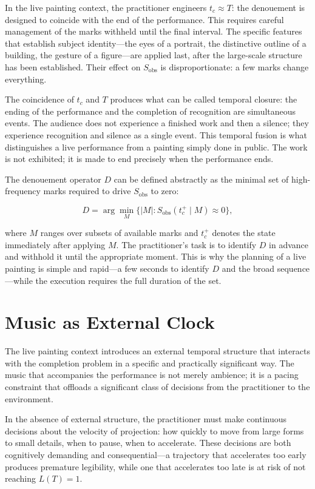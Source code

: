 \documentclass[12pt, twoside]{article}
\theoremstyle{plain}
\theoremstyle{definition}
\theoremstyle{remark}
\begin{document}
In the live painting context, the practitioner engineers $t_c \approx T$: the denouement is designed to coincide with the end of the performance. This requires careful management of the marks withheld until the final interval. The specific features that establish subject identity---the eyes of a portrait, the distinctive outline of a building, the gesture of a figure---are applied last, after the large-scale structure has been established. Their effect on $S_{\text{obs}}$ is disproportionate: a few marks change everything.

The coincidence of $t_c$ and $T$ produces what can be called temporal closure: the ending of the performance and the completion of recognition are simultaneous events. The audience does not experience a finished work and then a silence; they experience recognition and silence as a single event. This temporal fusion is what distinguishes a live performance from a painting simply done in public. The work is not exhibited; it is made to end precisely when the performance ends.

The denouement operator $D$ can be defined abstractly as the minimal set of high-frequency marks required to drive $S_{\text{obs}}$ to zero:

\[
D = \arg\min_{M} \{ |M| : S_{\text{obs}}(t_c^+ \mid M) \approx 0 \},
\]

where $M$ ranges over subsets of available marks and $t_c^+$ denotes the state immediately after applying $M$. The practitioner's task is to identify $D$ in advance and withhold it until the appropriate moment. This is why the planning of a live painting is simple and rapid---a few seconds to identify $D$ and the broad sequence---while the execution requires the full duration of the set.

\section{Music as External Clock}
\label{sec:music}

The live painting context introduces an external temporal structure that interacts with the completion problem in a specific and practically significant way. The music that accompanies the performance is not merely ambience; it is a pacing constraint that offloads a significant class of decisions from the practitioner to the environment.

In the absence of external structure, the practitioner must make continuous decisions about the velocity of projection: how quickly to move from large forms to small details, when to pause, when to accelerate. These decisions are both cognitively demanding and consequential---a trajectory that accelerates too early produces premature legibility, while one that accelerates too late is at risk of not reaching $L(T) = 1$.
\end{document}
